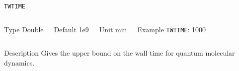 \begin{frame}[allowframebreaks]{\texttt{TWTIME}} \label{TWTIME}
\vspace*{-12pt}
\begin{columns}
\begin{block}{Type}
Double
\end{block}

\begin{block}{Default}
1e9
\end{block}

\begin{block}{Unit}
min
\end{block}

\begin{block}{Example}
\texttt{TWTIME}: 1000
\end{block}
\end{columns}

\begin{block}{Description}
Gives the upper bound on the wall time for quantum molecular dynamics.
\end{block}

\end{frame}
